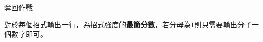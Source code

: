 \begin{problem}{奪回作戰}
\OutputFile

對於每個招式輸出一行，為招式強度的\textbf{最簡分數}，若分母為$1$則只需要輸出分子一個數字即可。

\Examples

\begin{example}
%
\end{example}

\end{problem}
